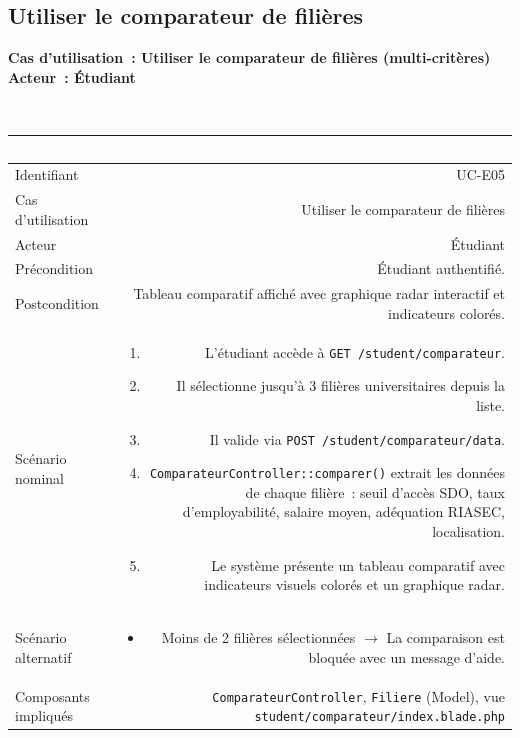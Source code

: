 \documentclass[a4paper,12pt]{article}
\newcommand{\ucheader}[2]{%
  \noindent\colorbox{capblue}{\parbox{\dimexpr\linewidth-2\fboxsep}{%
    \color{white}\bfseries\large Cas d'utilisation~: #1 \hfill \normalsize Acteur~: #2
  }}\\[2pt]
}
\begin{document}
\vspace{1em}

\subsection{Utiliser le comparateur de filières}
\ucheader{Utiliser le comparateur de filières (multi-critères)}{Étudiant}

\noindent
\begin{tabular}{|L|R|}
\hline
{}\textcolor{white}{\textbf{Champ}} & \textcolor{white}{\textbf{Description}} \\
\hline
{}Identifiant & UC-E05 \\
\hline
Cas d'utilisation & Utiliser le comparateur de filières \\
\hline
{}Acteur & Étudiant \\
\hline
Précondition & Étudiant authentifié. \\
\hline
{}Postcondition & Tableau comparatif affiché avec graphique radar interactif et indicateurs colorés. \\
\hline
Scénario nominal &
\begin{enumerate}
  \item L'étudiant accède à \texttt{GET /student/comparateur}.
  \item Il sélectionne jusqu'à 3 filières universitaires depuis la liste.
  \item Il valide via \texttt{POST /student/comparateur/data}.
  \item \texttt{ComparateurController::comparer()} extrait les données de chaque filière~: seuil d'accès SDO, taux d'employabilité, salaire moyen, adéquation RIASEC, localisation.
  \item Le système présente un tableau comparatif avec indicateurs visuels colorés et un graphique radar.
\end{enumerate} \\
\hline
{}Scénario alternatif &
\begin{itemize}
  \item Moins de 2 filières sélectionnées $\rightarrow$ La comparaison est bloquée avec un message d'aide.
\end{itemize} \\
\hline
Composants impliqués & \texttt{ComparateurController}, \texttt{Filiere} (Model), vue \texttt{student/comparateur/index.blade.php} \\
\hline
\end{tabular}
\end{document}
